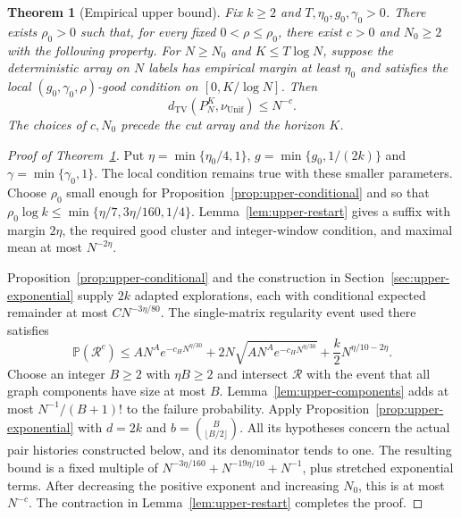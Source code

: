 \documentclass[11pt]{article}
\numberwithin{equation}{section}
\newtheorem{theorem}{Theorem}[section]
\theoremstyle{definition}
\theoremstyle{remark}
\newcommand{\Pp}{\mathbb P}
\newcommand{\TV}{\mathrm{TV}}
\newcommand{\Unif}{\mathrm{Unif}}
\newcommand{\dTV}{d_{\TV}}
\newcommand{\nuUnif}{\nu_{\Unif}}
\newcommand{\1}{\mathbf 1}
\begin{document}

\begin{theorem}[Empirical upper bound]%
\label{thm:upper-empirical}
Fix $k\ge2$ and $T,\eta_0,g_0,\gamma_0>0$. There exists $\rho_0>0$
such that, for every fixed $0<\rho\le\rho_0$, there exist $c>0$ and
$N_0\ge2$ with the following property. For $N\ge N_0$ and
$K\le T\log N$, suppose the deterministic array on $N$ labels has
empirical margin at least $\eta_0$ and satisfies the local
$(g_0,\gamma_0,\rho)$-good condition on $[0,K/\log N]$. Then
\begin{equation}\label{eq:upper-empirical-tv}
 \dTV(P_N^K,\nuUnif)\le N^{-c}.
\end{equation}
The choices of $c,N_0$ precede the cut array and the horizon $K$.
\end{theorem}

\begin{proof}[Proof of Theorem~\ref{thm:upper-empirical}]
Put $\eta=\min\{\eta_0/4,1\}$,
$g=\min\{g_0,1/(2k)\}$ and $\gamma=\min\{\gamma_0,1\}$.
The local condition remains true with these smaller parameters.
Choose $\rho_0$ small enough for Proposition~\ref{prop:upper-conditional}
and so that $\rho_0\log k\le\min\{\eta/7,3\eta/160,1/4\}$.
Lemma~\ref{lem:upper-restart} gives a suffix with margin $2\eta$,
the required good cluster and integer-window condition, and maximal
mean at most $N^{-2\eta}$.

Proposition~\ref{prop:upper-conditional} and the construction in
Section~\ref{sec:upper-exponential} supply $2k$ adapted explorations,
each with conditional expected remainder at most $CN^{-3\eta/80}$.
The single-matrix regularity event used there satisfies
\[
 \Pp(\mathcal R^c)\le
 AN^A e^{-c_H N^{\eta/30}}
 +2N\sqrt{AN^A e^{-c_H N^{\eta/30}}}
 +\frac{k}{2}N^{\eta/10-2\eta}.
\]
Choose an integer $B\ge2$ with $\eta B\ge2$ and intersect
$\mathcal R$ with the event that all graph components have size at
most $B$. Lemma~\ref{lem:upper-components} adds at most
$N^{-1}/(B+1)!$ to the failure probability. Apply
Proposition~\ref{prop:upper-exponential} with $d=2k$ and
$b=\binom B{\lfloor B/2\rfloor}$. All its hypotheses concern the
actual pair histories constructed below, and its denominator tends
to one. The resulting bound is a fixed multiple of
$N^{-3\eta/160}+N^{-19\eta/10}+N^{-1}$, plus stretched exponential
terms. After decreasing the positive exponent and increasing $N_0$,
this is at most $N^{-c}$. The contraction in
Lemma~\ref{lem:upper-restart} completes the proof.
\end{proof}
\end{document}
